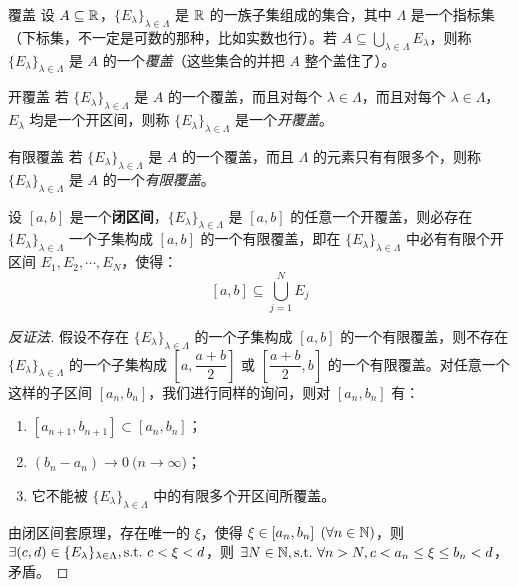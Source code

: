 \begin{definition}{覆盖}
	设 $A \subseteq \mathbb R$，$\{E_\lambda\}_{\lambda \in \Lambda}$ 是 $\mathbb R$ 的一族子集组成的集合，其中 $\Lambda$ 是一个指标集（下标集，不一定是可数的那种，比如实数也行）。若 $A \subseteq \bigcup\limits_{\lambda \in \Lambda} E_\lambda$，则称 $\{E_\lambda\}_{\lambda \in \Lambda}$ 是 $A$ 的一个\emph{覆盖}（这些集合的并把 $A$ 整个盖住了）。
\end{definition}

\begin{definition}{开覆盖}
	若 $\{E_\lambda\}_{\lambda \in \Lambda}$ 是 $A$ 的一个覆盖，而且对每个 $\lambda \in \Lambda$，而且对每个 $\lambda \in \Lambda$，$E_\lambda$ 均是一个开区间，则称 $\{E_\lambda\}_{\lambda \in \Lambda}$ 是一个\emph{开覆盖}。
\end{definition}

\begin{definition}{有限覆盖}
	若 $\{E_\lambda\}_{\lambda \in \Lambda}$ 是 $A$ 的一个覆盖，而且 $\Lambda$ 的元素只有有限多个，则称 $\{E_\lambda\}_{\lambda \in \Lambda}$ 是 $A$ 的一个\emph{有限覆盖}。
\end{definition}

\begin{theorem}[有限覆盖定理]
	设 $[a, b]$ 是一个\textbf{闭区间}，$\{E_\lambda\}_{\lambda \in \Lambda}$ 是 $[a, b]$ 的任意一个开覆盖，则必存在 $\{E_\lambda\}_{\lambda \in \Lambda}$ 一个子集构成 $[a, b]$ 的一个有限覆盖，即在 $\{E_\lambda\}_{\lambda \in \Lambda}$ 中必有有限个开区间 $E_1, E_2, \cdots, E_N$，使得：
	$$
	[a, b] \subseteq \bigcup\limits_{j = 1}^N E_j
	$$
\end{theorem}

\begin{proof}[反证法]
	假设不存在 $\{E_\lambda\}_{\lambda \in \Lambda}$ 的一个子集构成 $[a, b]$ 的一个有限覆盖，则不存在 $\{E_\lambda\}_{\lambda \in \Lambda}$ 的一个子集构成 $\left[ a, \dfrac{a + b}{2} \right]$ 或 $\left[ \dfrac{a + b}{2}, b \right]$ 的一个有限覆盖。对任意一个这样的子区间 $[a_n, b_n]$，我们进行同样的询问，则对 $[a_n, b_n]$ 有：

	\begin{enumerate}
		\item $[a_{n + 1}, b_{n + 1}] \subset [a_n, b_n]$；
		\item $(b_n - a_n) \rightarrow 0 \pod{n \rightarrow \infty}$；
		\item 它不能被 $\{E_\lambda\}_{\lambda \in \Lambda}$ 中的有限多个开区间所覆盖。
	\end{enumerate}

	由闭区间套原理，存在唯一的 $\xi$，使得 $\xi \in [a_n, b_n] \pod{\forall n \in \mathbb N}$，则 $\exists (c, d) \in \{E_\lambda\}_{\lambda \in \Lambda}, \text{s.t.~} c < \xi < d$，则 $\exists N \in \mathbb N, \text{s.t.~} \forall n > N, c < a_n \le \xi \le b_n < d$，矛盾。
\end{proof}

